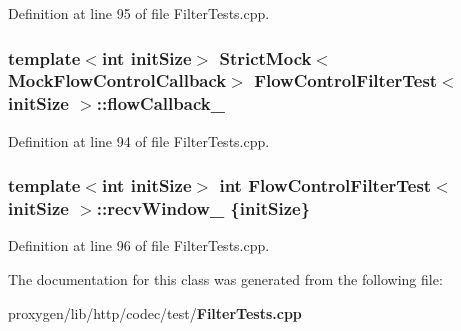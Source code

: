 Definition at line 95 of file Filter\+Tests.\+cpp.

\subsubsection[{flow\+Callback\+\_\+}]{\setlength{\rightskip}{0pt plus 5cm}template$<$int init\+Size$>$ Strict\+Mock$<${\bf Mock\+Flow\+Control\+Callback}$>$ {\bf Flow\+Control\+Filter\+Test}$<$ init\+Size $>$\+::flow\+Callback\+\_\+}\label{classFlowControlFilterTest_ac100cbc3c6c3115d88037061bc1a220d}


Definition at line 94 of file Filter\+Tests.\+cpp.

\subsubsection[{recv\+Window\+\_\+}]{\setlength{\rightskip}{0pt plus 5cm}template$<$int init\+Size$>$ int {\bf Flow\+Control\+Filter\+Test}$<$ init\+Size $>$\+::recv\+Window\+\_\+ \{init\+Size\}}\label{classFlowControlFilterTest_a7c31bfec35dd326f64047f0acf5629fc}


Definition at line 96 of file Filter\+Tests.\+cpp.



The documentation for this class was generated from the following file\+:\begin{DoxyCompactItemize}
\item 
proxygen/lib/http/codec/test/{\bf Filter\+Tests.\+cpp}\end{DoxyCompactItemize}
